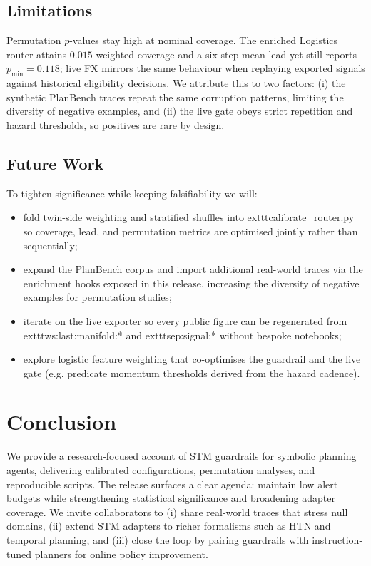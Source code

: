 \documentclass[11pt]{article}
\begin{document}
\subsection{Limitations}
Permutation $p$-values stay high at nominal coverage. The enriched Logistics
router attains $0.015$ weighted coverage and a six-step mean lead yet still
reports $p_{\min}=0.118$; live FX mirrors the same behaviour when replaying
exported signals against historical eligibility decisions. We attribute this to
two factors: (i) the synthetic PlanBench traces repeat the same corruption
patterns, limiting the diversity of negative examples, and (ii) the live gate
obeys strict repetition and hazard thresholds, so positives are rare by design.
\subsection{Future Work}
To tighten significance while keeping falsifiability we will:
\begin{itemize}
  \item fold twin-side weighting and stratified shuffles into
        	exttt{calibrate\_router.py} so coverage, lead, and permutation metrics are
        optimised jointly rather than sequentially;
  \item expand the PlanBench corpus and import additional real-world traces via
        the enrichment hooks exposed in this release, increasing the diversity of
        negative examples for permutation studies;
  \item iterate on the live exporter so every public figure can be regenerated
        from 	exttt{ws:last:manifold:*} and 	exttt{sep:signal:*} without bespoke
        notebooks;
  \item explore logistic feature weighting that co-optimises the guardrail and
        the live gate (e.g. predicate momentum thresholds derived from the hazard
        cadence).
\end{itemize}
\section{Conclusion}
We provide a research-focused account of STM guardrails for symbolic planning
agents, delivering calibrated configurations, permutation analyses, and
reproducible scripts. The release surfaces a clear agenda: maintain low alert
budgets while strengthening statistical significance and broadening adapter
coverage. We invite collaborators to (i) share real-world traces that stress
null domains, (ii) extend STM adapters to richer formalisms such as HTN and
temporal planning, and (iii) close the loop by pairing guardrails with
instruction-tuned planners for online policy improvement.
\end{document}
